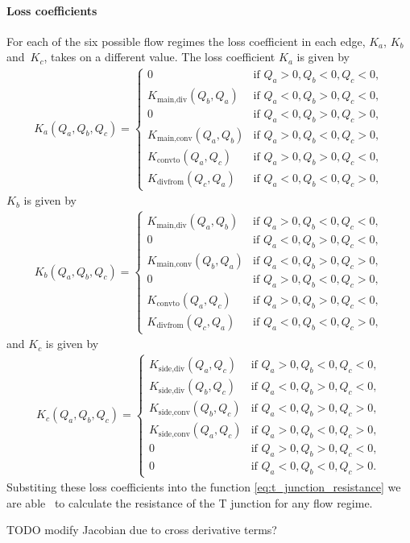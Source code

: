 \paragraph{Loss coefficients}

For each of the six possible flow regimes the loss coefficient in each edge, $K_a$, $K_b$ and\
$K_c$, takes on a different value. The loss coefficient $K_a$ is given by 
\begin{align} \label{eq:K_a}
    \boxed{ K_a(Q_a, Q_b, Q_c) = \begin{cases}
        0 & \text{if } Q_a > 0, Q_b < 0, Q_c < 0, \\
        K_{\text{main,div}}(Q_b, Q_a) & \text{if } Q_a < 0, Q_b > 0, Q_c < 0, \\
        0 & \text{if } Q_a < 0, Q_b > 0, Q_c > 0, \\
        K_{\text{main,conv}}(Q_a, Q_b) & \text{if } Q_a > 0, Q_b < 0, Q_c > 0, \\
        K_{\text{convto}}(Q_a, Q_c) & \text{if } Q_a > 0, Q_b > 0, Q_c < 0, \\
        K_{\text{divfrom}}(Q_c, Q_a) & \text{if } Q_a < 0, Q_b < 0, Q_c > 0,
    \end{cases} }
\end{align}
$K_b$ is given by
\begin{align} \label{eq:K_b}
    \boxed{ K_b(Q_a, Q_b, Q_c) = \begin{cases}
        K_{\text{main,div}}(Q_a, Q_b) & \text{if } Q_a > 0, Q_b < 0, Q_c < 0, \\
        0 & \text{if } Q_a < 0, Q_b > 0, Q_c < 0, \\
        K_{\text{main,conv}}(Q_b, Q_a) & \text{if } Q_a < 0, Q_b > 0, Q_c > 0, \\
        0 & \text{if } Q_a > 0, Q_b < 0, Q_c > 0, \\
        K_{\text{convto}}(Q_a, Q_c) & \text{if } Q_a > 0, Q_b > 0, Q_c < 0, \\
        K_{\text{divfrom}}(Q_c, Q_a) & \text{if } Q_a < 0, Q_b < 0, Q_c > 0,
    \end{cases} }
\end{align}
and $K_c$ is given by
\begin{align} \label{eq:K_c}
    \boxed{ K_c(Q_a, Q_b, Q_c) = \begin{cases}
        K_{\text{side,div}}(Q_a, Q_c) & \text{if } Q_a > 0, Q_b < 0, Q_c < 0, \\
        K_{\text{side,div}}(Q_b, Q_c) & \text{if } Q_a < 0, Q_b > 0, Q_c < 0, \\
        K_{\text{side,conv}}(Q_b, Q_c) & \text{if } Q_a < 0, Q_b > 0, Q_c > 0, \\
        K_{\text{side,conv}}(Q_a, Q_c) & \text{if } Q_a > 0, Q_b < 0, Q_c > 0, \\
        0 & \text{if } Q_a > 0, Q_b > 0, Q_c < 0, \\
        0 & \text{if } Q_a < 0, Q_b < 0, Q_c > 0.
    \end{cases} }
\end{align}
Substiting these loss coefficients into the function \eqref{eq:t_junction_resistance} we are able \ 
to calculate the resistance of the T junction for any flow regime.

{\color{red} TODO modify Jacobian due to cross derivative terms?}



